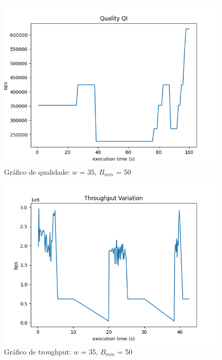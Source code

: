\documentclass[10pt,twocolumn,letterpaper]{article}
\begin{document}
	\begin{figure}
		\centering
		\includegraphics[width=\linewidth]{0.35 - 50 - qual.png}
		\caption{Gráfico de qualidade: $w$ = 35, $B_{min}$ = 50}
		\label{fig:3}
	\end{figure}
	\begin{figure}
		\centering
		\includegraphics[width=\linewidth]{0.35 - 50 - Throughput .png}
		\caption{Gráfico de troughput: $w$ = 35, $B_{min}$ = 50}
		\label{fig:4}
	\end{figure}
	
\end{document}
